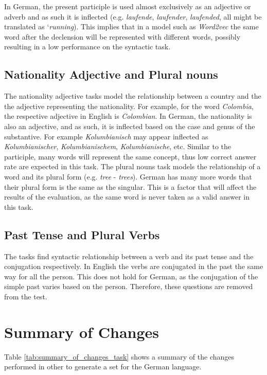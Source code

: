In German, the present participle is used almost exclusively as an
adjective or adverb and as such it is inflected (e.g. \textit{laufende},
\textit{laufender}, \textit{laufended}, all might be translated as
`\textit{running}). This implies that in a model
such as  \textit{Word2vec} the same word after the declension will be
represented with different words, possibly resulting in a low performance on
the syntactic task. 


\subsection{Nationality Adjective and  Plural nouns}
\label{sec:sub_sec_nat_plu}

The nationality adjective tasks model the relationship between a country and
the the adjective representing the nationality. For example, for the word
\textit{Colombia}, the respective adjective in English is \textit{Colombian}. In German,
the nationality is also an adjective, and as such, it  is inflected based on the
case and genus of the substantive.  For example  \textit{Kolumbianisch} may appear 
inflected as \textit{Kolumbianischer},  \textit{Kolumbianischem},
\textit{Kolumbianische}, etc.  Similar to the participle, many words will
represent the same concept, thus low correct answer rate are expected in this
task.  
The plural nouns task models the relationship of a word and its plural form
(e.g. \textit{tree} - \textit{trees}).
German has many more words that their plural form  is the same as the singular. 
This is a factor that will affect the results of the evaluation,  as the same word is never taken as a
valid answer in this task.


\subsection{Past Tense and Plural Verbs}
\label{sec:sub_sec_plural_verbs}
The  tasks find syntactic relationship between a verb and its past tense
and the conjugation respectively. In English the verbs are conjugated in the
past the same way for all the person. This does not hold for German, as the
conjugation of the simple past varies based on the person. Therefore, these questions are removed from the test.

\section{Summary of Changes} 
Table \ref{tab:summary_of_changes_task} shows a summary of the changes
performed in other to generate a set for the German language.

